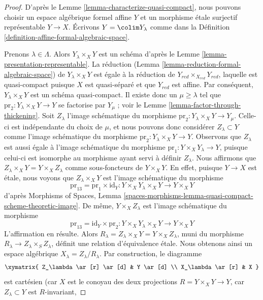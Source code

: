 \begin{proof}
D'après le Lemme \ref{lemma-characterize-quasi-compact}, nous pouvons choisir un
espace algébrique formel affine $Y$ et un morphisme étale surjectif
représentable $Y \to X$. Écrivons $Y = \colim Y_\lambda$ comme dans la
Définition \ref{definition-affine-formal-algebraic-space}.

\medskip\noindent
Prenons $\lambda \in \Lambda$. Alors $Y_\lambda \times_X Y$ est un schéma d'après le
Lemme \ref{lemma-presentation-representable}. La réduction
(Lemma \ref{lemma-reduction-formal-algebraic-space})
de $Y_\lambda \times_X Y$ est égale à la réduction de
$Y_{red} \times_{X_{red}} Y_{red}$, laquelle est quasi-compact puisque $X$
est quasi-séparé et que $Y_{red}$ est affine.
Par conséquent, $Y_\lambda \times_X Y$ est un schéma quasi-compact.
Il existe donc un $\mu \geq \lambda$ tel que
$\text{pr}_2 : Y_\lambda \times_X Y \to Y$ se factorise
par $Y_\mu$ ; voir le Lemme \ref{lemma-factor-through-thickening}.
Soit $Z_\lambda$ l'image schématique du morphisme
$\text{pr}_2 : Y_\lambda \times_X Y \to Y_\mu$.
Celle-ci est indépendante du choix de $\mu$, et nous pouvons donc
considérer $Z_\lambda \subset Y$ comme l'image schématique
du morphisme $\text{pr}_2 : Y_\lambda \times_X Y \to Y$.
Observons que $Z_\lambda$ est aussi égale à l'image schématique
du morphisme $\text{pr}_1 : Y \times_X Y_\lambda \to Y$, puisque
celui-ci est isomorphe au morphisme ayant servi à définir $Z_\lambda$.
Nous affirmons que $Z_\lambda \times_X Y = Y \times_X Z_\lambda$ comme sous-foncteurs
de $Y \times_X Y$. En effet, puisque $Y \to X$ est étale, nous voyons que
$Z_\lambda \times_X Y$ est l'image schématique du morphisme
$$
\text{pr}_{13} = \text{pr}_1 \times \text{id}_Y :
Y \times_X Y_\lambda \times_X Y \longrightarrow Y \times_X Y
$$
d'après Morphisms of Spaces, Lemma
\ref{spaces-morphisms-lemma-quasi-compact-scheme-theoretic-image}.
De même, $Y \times_X Z_\lambda$ est l'image schématique
du morphisme
$$
\text{pr}_{13} = \text{id}_Y \times \text{pr}_2 : 
Y \times_X Y_\lambda \times_X Y \longrightarrow Y \times_X Y
$$
L'affirmation en résulte. Alors
$R_\lambda = Z_\lambda \times_X Y = Y \times_X Z_\lambda$,
muni du morphisme $R_\lambda \to Z_\lambda \times_S Z_\lambda$,
définit une relation d'équivalence étale. Nous obtenons ainsi un espace
algébrique $X_\lambda = Z_\lambda/R_\lambda$. Par construction, le diagramme
$$
\xymatrix{
Z_\lambda \ar[r] \ar[d] & Y \ar[d] \\
X_\lambda \ar[r] & X
}
$$
est cartésien (car $X$ est le conoyau des deux projections
$R = Y \times_X Y \to Y$, car $Z_\lambda \subset Y$ est $R$-invariant,

\end{proof}
